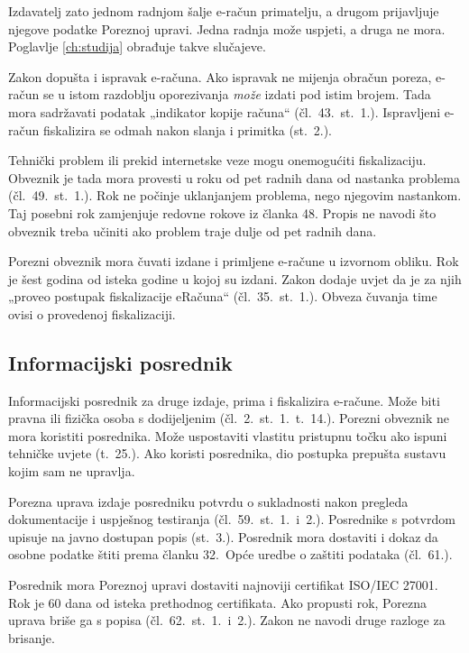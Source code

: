 Izdavatelj zato jednom radnjom šalje e-račun primatelju, a drugom prijavljuje
njegove podatke Poreznoj upravi. Jedna radnja može uspjeti, a druga ne mora.
Poglavlje \ref{ch:studija} obrađuje takve slučajeve.

Zakon dopušta i ispravak e-računa. Ako ispravak ne mijenja obračun poreza,
e-račun se u istom razdoblju oporezivanja \emph{može} izdati pod istim
brojem. Tada mora sadržavati podatak „indikator kopije računa“
(čl.~43.~st.~1.). Ispravljeni e-račun fiskalizira se odmah nakon slanja i
primitka (st.~2.).

Tehnički problem ili prekid internetske veze mogu onemogućiti
fiskalizaciju. Obveznik je tada mora provesti u roku od pet radnih dana od
nastanka problema (čl.~49.~st.~1.). Rok ne počinje uklanjanjem problema, nego
njegovim nastankom. Taj posebni rok zamjenjuje redovne rokove iz članka 48.
Propis ne navodi što obveznik treba učiniti ako problem traje dulje od pet
radnih dana.

Porezni obveznik mora čuvati izdane i primljene e-račune u izvornom obliku.
Rok je šest godina od isteka godine u kojoj su izdani. Zakon dodaje uvjet da
je za njih „proveo postupak fiskalizacije eRačuna“ (čl.~35.~st.~1.). Obveza
čuvanja time ovisi o provedenoj fiskalizaciji.

\subsection{Informacijski posrednik}
\label{sec:posrednik}

Informacijski posrednik za druge izdaje, prima i fiskalizira e-račune. Može
biti pravna ili fizička osoba s dodijeljenim
 (čl.~2.~st.~1.~t.~14.).
Porezni obveznik ne mora koristiti posrednika. Može uspostaviti vlastitu
pristupnu točku ako ispuni tehničke uvjete (t.~25.). Ako
koristi posrednika, dio postupka prepušta sustavu kojim sam ne upravlja.

Porezna uprava izdaje posredniku potvrdu o sukladnosti nakon pregleda
dokumentacije i uspješnog testiranja (čl.~59.~st.~1.\ i~2.). Posrednike s
potvrdom upisuje na javno dostupan popis (st.~3.). Posrednik mora dostaviti i
dokaz da osobne podatke štiti prema članku 32.\ Opće uredbe o zaštiti
podataka (čl.~61.).

Posrednik mora Poreznoj upravi dostaviti najnoviji certifikat ISO/IEC 27001.
Rok je 60 dana od isteka prethodnog certifikata. Ako propusti rok, Porezna
uprava briše ga s popisa (čl.~62.~st.~1.\ i~2.). Zakon ne navodi druge razloge
za brisanje.


